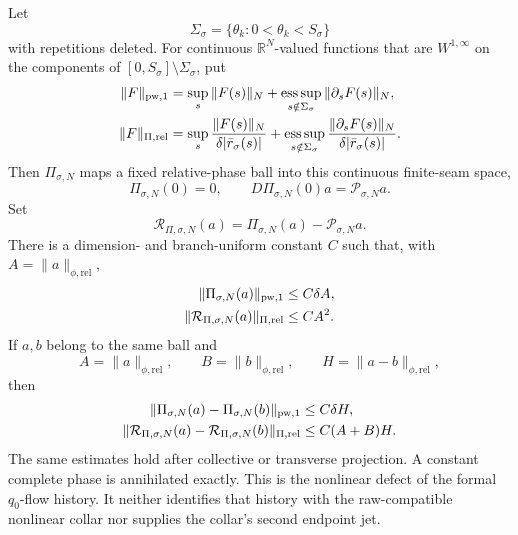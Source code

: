 \begin{lemma}
Let
\[
 \Sigma_\sigma
 =\{\theta_k:0<\theta_k<S_\sigma\}
\]
with repetitions deleted.  For continuous \(\mathbb R^N\)-valued functions that
are \(W^{1,\infty}\) on the components of
\([0,S_\sigma]\setminus\Sigma_\sigma\), put
\begin{align}
 \|F\|_{\mathrm{pw},1}
 &=\sup_s\|F(s)\|_N
   +\operatorname*{ess\,sup}_{s\notin\Sigma_\sigma}
          \|\partial_sF(s)\|_N,\notag\\
 \|F\|_{\Pi,\mathrm{rel}}
 &=\sup_s\frac{\|F(s)\|_N}
                    {\delta|\bar r_\sigma(s)|}
   +\operatorname*{ess\,sup}_{s\notin\Sigma_\sigma}
       \frac{\|\partial_sF(s)\|_N}
                    {\delta|\bar r_\sigma(s)|}.   \label{eq:nonlinear-phase-delay-range-norms}
\end{align}
Then \(\Pi_{\sigma,N}\) maps a fixed relative-phase ball into this
continuous finite-seam space,
\begin{equation}
 \Pi_{\sigma,N}(0)=0,\qquad
 D\Pi_{\sigma,N}(0)a=\mathscr P_{\sigma,N}a.       \label{eq:nonlinear-phase-delay-linearization}
\end{equation}
Set
\begin{equation}
 \mathcal R_{\Pi,\sigma,N}(a)
 =\Pi_{\sigma,N}(a)-\mathscr P_{\sigma,N}a.        \label{eq:nonlinear-phase-delay-remainder}
\end{equation}
There is a dimension- and branch-uniform constant \(C\) such that, with
\(A=\|a\|_{\phi,\mathrm{rel}}\),
\begin{align}
 \|\Pi_{\sigma,N}(a)\|_{\mathrm{pw},1}
 &\le C\delta A,\notag\\
 \|\mathcal R_{\Pi,\sigma,N}(a)\|_{\Pi,\mathrm{rel}}
 &\le CA^2.                                       \label{eq:nonlinear-phase-delay-quadratic-bound}
\end{align}
If \(a,b\) belong to the same ball and
\[
 A=\|a\|_{\phi,\mathrm{rel}},\qquad
 B=\|b\|_{\phi,\mathrm{rel}},\qquad
 H=\|a-b\|_{\phi,\mathrm{rel}},
\]
then
\begin{align}
 \|\Pi_{\sigma,N}(a)-\Pi_{\sigma,N}(b)\|_{\mathrm{pw},1}
 &\le C\delta H,\notag\\
 \|\mathcal R_{\Pi,\sigma,N}(a)
       -\mathcal R_{\Pi,\sigma,N}(b)\|_{\Pi,\mathrm{rel}}
 &\le C(A+B)H.                                    \label{eq:nonlinear-phase-delay-two-point}
\end{align}
The same estimates hold after collective or transverse projection.  A
constant complete phase is annihilated exactly.  This is the nonlinear
defect of the formal \(q_0\)-flow history.  It neither identifies that
history with the raw-compatible nonlinear collar nor supplies the collar's
second endpoint jet.
\end{lemma}

